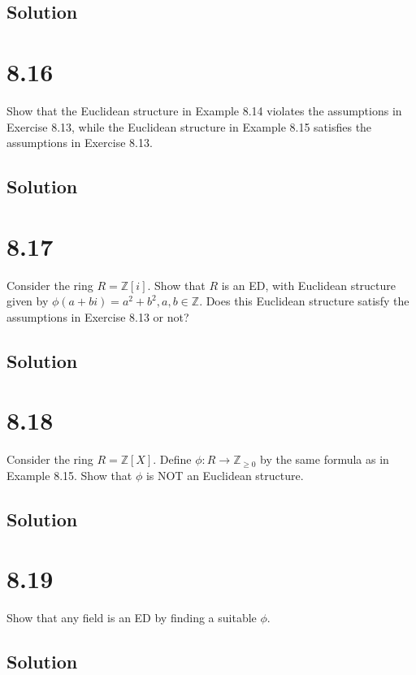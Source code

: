 \documentclass[fleqn]{article}
\begin{document}
        \subsection{Solution}
        
    
    \section{8.16}
    Show that the Euclidean structure in Example 8.14 violates the assumptions in Exercise 8.13, while the Euclidean structure in Example 8.15 satisfies the assumptions in Exercise 8.13.
        
        \subsection{Solution}
        
    
    \section{8.17}
    Consider the ring $R = \mathbb{Z}[i]$.  Show that $R$ is an ED, with Euclidean structure given by $\phi(a + bi) = a^2 + b^2, a, b \in \mathbb{Z}$.  Does this Euclidean structure satisfy the assumptions in Exercise 8.13 or not?
        
        \subsection{Solution}
        
    
    \section{8.18}
    Consider the ring $R = \mathbb{Z}[X]$.  Define $\phi: R \to \mathbb{Z}_{\geq 0}$ by the same formula as in Example 8.15.  Show that $\phi$ is NOT an Euclidean structure.
        
        \subsection{Solution}
        
    
    \section{8.19}
    Show that any field is an ED by finding a suitable $\phi$.
        
        \subsection{Solution}
        
\end{document}
